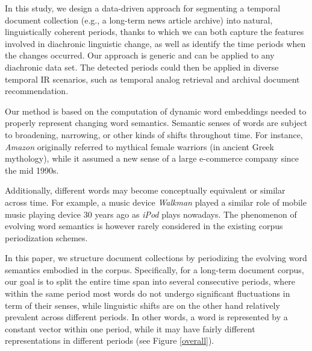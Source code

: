 \documentclass[output=paper]{langsci/langscibook}
\begin{document}
In this study, we design a data-driven approach for segmenting a temporal document collection (e.g., a long-term news article archive) into natural, linguistically coherent periods, thanks to which we can both capture the features involved in diachronic linguistic change, as well as identify the time periods when the changes occurred. Our approach is generic and can be applied to any diachronic data set. The detected periods could then be applied in diverse temporal IR scenarios, such as temporal analog retrieval and archival document recommendation.


Our method is based on the computation of dynamic word embeddings needed to properly represent changing word semantics.
Semantic senses of words are subject to broadening, narrowing, or other kinds of shifts throughout time. 
For instance, \textit{Amazon} originally referred to mythical female warriors (in ancient Greek mythology), while it assumed a new sense of a large e-commerce company since the mid 1990s.

Additionally, different words may become conceptually equivalent or similar across time. For example, a music device \textit{Walkman} played a similar role of mobile music playing device 30 years ago as \textit{iPod} plays nowadays. The phenomenon of evolving word semantics is however rarely considered in the existing corpus periodization schemes.


In this paper, we structure document collections by periodizing the evolving word semantics embodied in the corpus.
Specifically, for a long-term document corpus, our goal is to split the entire time span into several consecutive periods, where within the same period most words do not undergo significant fluctuations in term of their senses, while linguistic shifts are on the other hand relatively prevalent across different periods. 
In other words, a word is represented by a constant vector within one period, while it may have fairly different representations in different periods (see Figure \ref{overall}). 
\end{document}
